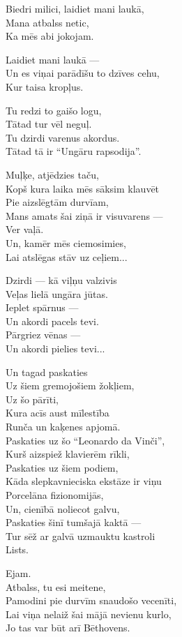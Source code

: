 \documentclass[14pt]{extarticle}
\begin{document}
Biedri milici, laidiet mani laukā,\\
Mana atbalss netic,\\
Ka mēs abi jokojam.

Laidiet mani laukā ---\\
Un es viņai parādīšu to dzīves cehu,\\
Kur taisa kropļus.

Tu redzi to gaišo logu,\\
Tātad tur vēl neguļ.\\
Tu dzirdi varenus akordus.\\
Tātad tā ir ``Ungāru rapsodija''.

Muļķe, atjēdzies taču,\\
Kopš kura laika mēs sāksim klauvēt\\
Pie aizslēgtām durvīam,\\
Mans amats šai ziņā ir visuvarens ---\\
Ver vaļā.\\
Un, kamēr mēs ciemosimies,\\
Lai atslēgas stāv uz ceļiem...

Dzirdi --- kā viļņu valzivis\\
Veļas lielā ungāra jūtas.\\
Ieplet spārnus ---\\
Un akordi pacels tevi.\\
Pārgriez vēnas ---\\
Un akordi pielies tevi...

Un tagad paskaties\\
Uz šiem gremojošiem žokļiem,\\
Uz šo pārīti,\\
Kura acīs aust mīlestība\\
Runča un kaķenes apjomā.\\
Paskaties uz šo ``Leonardo da Vinči'',\\
Kurš aizspiež klavierēm rīkli,\\
Paskaties uz šiem podiem,\\
Kāda slepkavnieciska ekstāze ir viņu\\
Porcelāna fizionomijās,\\
Un, cienībā noliecot galvu,\\
Paskaties šinī tumšajā kaktā ---\\
Tur sēž ar galvā uzmauktu kastroli\\
Lists.

Ejam.\\
Atbalss, tu esi meitene,\\
Pamodini pie durvīm snaudošo vecenīti,\\
Lai viņa nelaiž šai mājā nevienu kurlo,\\
Jo tas var būt arī Bēthovens.
\end{document}
